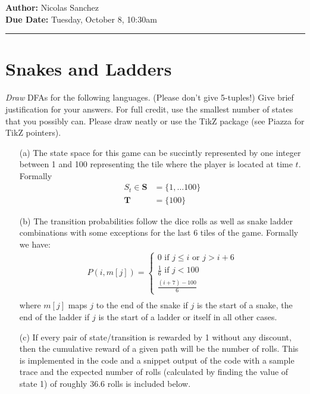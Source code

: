 \documentclass{article}[12pt]
\newcommand{\headings}[4]{\noindent {\bf Assignment 1 CME241} \hfill {{\bf Author:} Nicolas Sanchez} \\
{} \hfill {{\bf Due Date:} #2} \\

\rule[0.1in]{\textwidth}{0.025in}
}
\begin{document}
\headings{\#1}{Tuesday, October 8, 10:30am}\section{} 



\section{Snakes and Ladders}

{\em Draw} DFAs for the following languages. (Please don't give 5-tuples!) Give brief justification for your answers. For full credit, use the smallest number of states that you possibly can. Please draw neatly or use the TikZ package (see Piazza for TikZ pointers).

\begin{itemize}
\item[(a)] The state space for this game can be succintly represented by one integer between 1 and 100 representing the tile where the player is located at time $t$. Formally
\begin{align*}
S_t \in \mathbf{S}& =\{1,\ldots 100\}\\
\mathbf{T}& = \{100\}
\end{align*} 
\item[(b)] The transition probabilities follow the dice rolls as well as snake ladder combinations with some exceptions for the last 6 tiles of the game. Formally we have:
\begin{align*}
P(i,m[j]) =  \begin{cases} 0 \text{ if $j\leq i$ or $j> i+6$}\\ \frac{1}{6} \text{ if $j<100$} \\ \frac{(i+7)-100}{6} \end{cases}\\
\end{align*} 
where $m[j]$ maps $j$ to the end of the snake if $j$ is the start of a snake, the end of the ladder if $j$ is the start of a ladder or itself in all other cases.\\


\item[(c)]  If every pair of state/transition is rewarded by 1 without any discount, then the cumulative reward of a given path will be the number of rolls. This is implemented in the code and a snippet output of the code with a sample trace and the expected number of rolls (calculated by finding the value of state 1) of roughly 36.6 rolls is included below.




\end{itemize}
\end{document}
